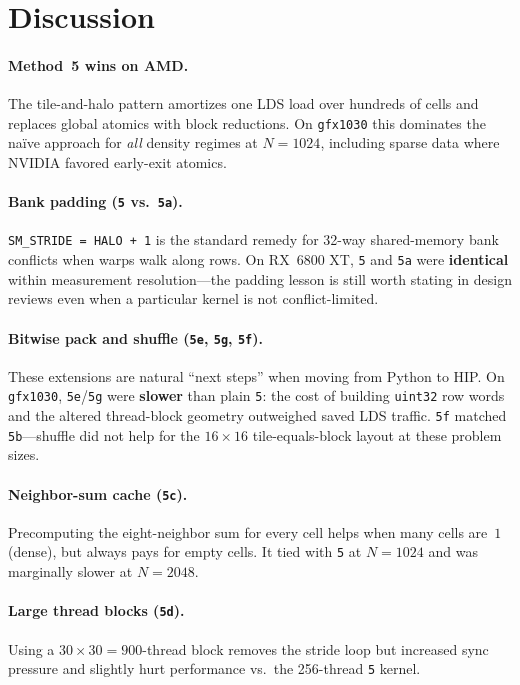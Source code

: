 \documentclass[11pt,a4paper]{article}
\begin{document}
\section{Discussion}
\label{sec:discussion}

\paragraph{Method~5 wins on AMD.}
The tile-and-halo pattern amortizes one LDS load over hundreds of cells and
replaces global atomics with block reductions.
On \texttt{gfx1030} this dominates the na\"ive approach for \emph{all} density
regimes at $N{=}1024$, including sparse data where NVIDIA favored early-exit
atomics.

\paragraph{Bank padding (\texttt{5} vs.\ \texttt{5a}).}
\texttt{SM\_STRIDE = HALO + 1} is the standard remedy for 32-way shared-memory
bank conflicts when warps walk along rows.
On RX~6800 XT, \texttt{5} and \texttt{5a} were \textbf{identical} within
measurement resolution---the padding lesson is still worth stating in design
reviews even when a particular kernel is not conflict-limited.

\paragraph{Bitwise pack and shuffle (\texttt{5e}, \texttt{5g}, \texttt{5f}).}
These extensions are natural ``next steps'' when moving from Python to HIP.
On \texttt{gfx1030}, \texttt{5e}/\texttt{5g} were \textbf{slower} than plain
\texttt{5}: the cost of building \texttt{uint32} row words and the altered
thread-block geometry outweighed saved LDS traffic.
\texttt{5f} matched \texttt{5b}---shuffle did not help for the $16{\times}16$
tile-equals-block layout at these problem sizes.

\paragraph{Neighbor-sum cache (\texttt{5c}).}
Precomputing the eight-neighbor sum for every cell helps when many cells are~$1$
(dense), but always pays for empty cells.
It tied with \texttt{5} at $N{=}1024$ and was marginally slower at $N{=}2048$.

\paragraph{Large thread blocks (\texttt{5d}).}
Using a $30{\times}30 = 900$-thread block removes the stride loop but increased
sync pressure and slightly hurt performance vs.\ the 256-thread \texttt{5}
kernel.
\end{document}
